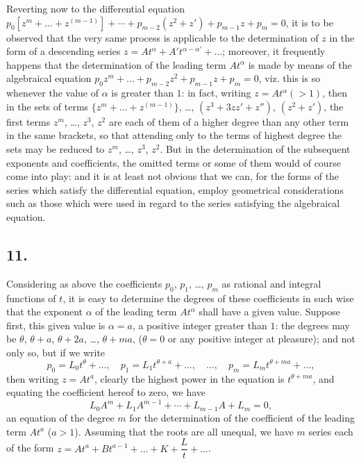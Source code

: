 \documentclass[11pt,a4paper]{article}
\theoremstyle{definition}
\begin{document}
Reverting now to the differential equation $p_0[z^m + \ldots + z^{(m-1)}] + \cdots + p_{m-2}(z^2 + z') + p_{m-1}z + p_m = 0$, it is to be observed that the very same process is applicable to the determination of $z$ in the form of a descending series $z = At^\alpha + A' t^{\alpha - \alpha'} + \ldots$; moreover, it frequently happens that the determination of the leading term $At^\alpha$ is made by means of the algebraical equation $p_0 z^m + \ldots + p_{m-2}z^2 + p_{m-1}z + p_m = 0$, viz. this is so whenever the value of $\alpha$ is greater than $1$: in fact, writing $z = At^\alpha(> 1)$, then in the sets of terms $\{z^m + \ldots + z^{(m-1)}\}$, \ldots, $(z^3 + 3zz' + z'')$, $(z^2 + z')$, the first terms $z^m$, \ldots, $z^3$, $z^2$ are each of them of a higher degree than any other term in the same brackets, so that attending only to the terms of highest degree the sets may be reduced to $z^m$, \ldots, $z^3$, $z^2$. But in the determination of the subsequent exponents and coefficients, the omitted terms or some of them would of course come into play: and it is at least not obvious that we can, for the forms of the series which satisfy the differential equation, employ geometrical considerations such as those which were used in regard to the series satisfying the algebraical equation.

\subsection*{11.}

Considering as above the coefficients $p_0$, $p_1$, \ldots, $p_m$ as rational and integral functions of $t$, it is easy to determine the degrees of these coefficients in such wise that the exponent $\alpha$ of the leading term $At^\alpha$ shall have a given value. Suppose first, this given value is $\alpha = a$, a positive integer greater than $1$: the degrees may be $\theta$, $\theta + a$, $\theta + 2a$, \ldots, $\theta + ma$, ($\theta = 0$ or any positive integer at pleasure); and not only so, but if we write
\[
p_0 = L_0 t^\theta + \ldots, \quad p_1 = L_1 t^{\theta + a} + \ldots, \quad \ldots, \quad p_m = L_m t^{\theta + ma} + \ldots,
\]
then writing $z = At^a$, clearly the highest power in the equation is $t^{\theta + ma}$, and equating the coefficient hereof to zero, we have
\[
L_0 A^m + L_1 A^{m-1} + \cdots + L_{m-1}A + L_m = 0,
\]
an equation of the degree $m$ for the determination of the coefficient of the leading term $At^a$ ($a > 1$). Assuming that the roots are all unequal, we have $m$ series each of the form $z = At^a + Bt^{a-1} + \ldots + K + \dfrac{L}{t} + \ldots$.
\end{document}
